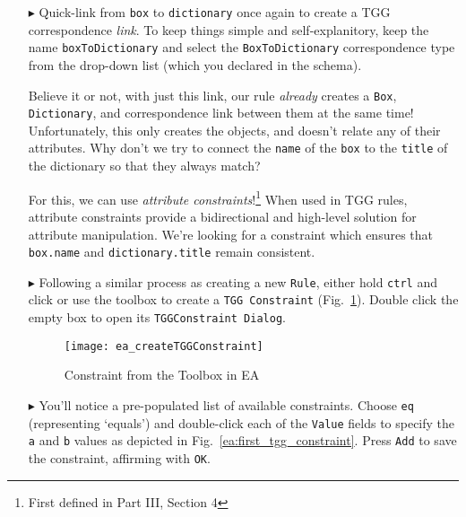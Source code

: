 \begin{enumerate}
\newpage

\item[$\blacktriangleright$] Quick-link from \texttt{box} to \texttt{dictionary} once again to create a TGG correspondence \emph{link}. To keep things simple
and self-explanitory, keep the name \texttt{boxToDictionary} and select the \texttt{BoxToDictionary} correspondence type from the drop-down list (which you
declared in the schema).

\vspace{0.25cm}

Believe it or not, with just this link, our rule \emph{already} creates a \texttt{Box}, \texttt{Dictionary}, and correspondence link between them at the same
time! Unfortunately, this only creates the objects, and doesn't relate any of their attributes. Why don't we try to connect the \texttt{name} of the
\texttt{box} to the \texttt{title} of the dictionary so that they always match?

\vspace{0.25cm}

For this, we can use \emph{attribute constraints}!\footnote{First defined in Part III, Section 4} When used in TGG rules, attribute constraints
provide a bidirectional and high-level solution for attribute manipulation. We're looking for a constraint which ensures that \texttt{box.name} and
\texttt{dictionary.title} remain consistent.

\vspace{0.5cm}

\item[$\blacktriangleright$] Following a similar process as creating a new \texttt{Rule}, either hold \texttt{ctrl} and click or use the toolbox to create a
\texttt{TGG Constraint} (Fig.~\ref{ea:common_toolbox}).  Double click the empty box to open its \texttt{TGGConstraint Dialog}.

\vspace{0.5cm}

\begin{figure}[htbp]
\begin{center}
  \texttt{[image: ea\_createTGGConstraint]}
  \caption{Constraint from the Toolbox in EA}
  \label{ea:common_toolbox}
\end{center}
\end{figure}

\item[$\blacktriangleright$] You'll notice a pre-populated list of available constraints. Choose \texttt{eq} (representing `equals') and double-click each of
the \texttt{Value} fields to specify the \texttt{a} and \texttt{b} values as depicted in Fig.~\ref{ea:first_tgg_constraint}. Press \texttt{Add} to save the
constraint, affirming with \texttt{OK}.


\end{enumerate}
